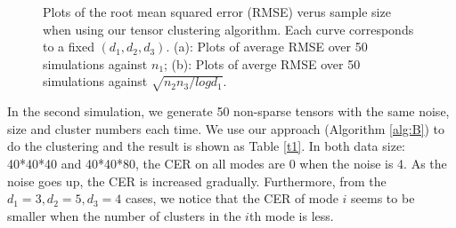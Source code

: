 \documentclass{article}
\begin{document}
\begin{figure}
	\centering
	\caption{Plots of the root mean squared error (RMSE) verus sample size when using our tensor clustering algorithm. Each curve corresponds to a fixed $(d_1,d_2,d_3)$. (a): Plots of average RMSE over 50 simulations against $n_1$; (b): Plots of averge RMSE over 50 simulations against $\sqrt{n_2n_3/logd_1}$. }
	
	\label{fig3}
\end{figure}

In the second simulation, we generate 50 non-sparse tensors with the same noise, size and cluster numbers each time. We use our approach (Algorithm \ref{alg:B}) to do the clustering and the result is shown as Table \ref{t1}. In both data size: 40*40*40 and 40*40*80, the CER on all modes are 0 when the noise is 4. As the noise goes up, the CER is increased gradually. Furthermore, from the $d_1=3, d_2=5, d_3=4$ cases, we notice that the CER of mode $i$ seems to be smaller when the number of clusters in the $i$th mode is less. \par 
\end{document}
